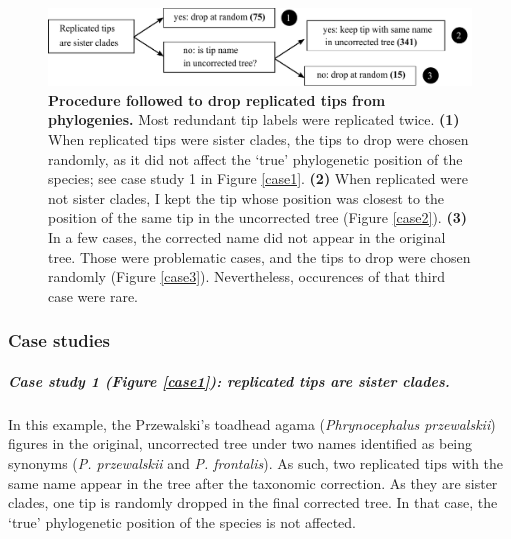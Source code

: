 \documentclass[11pt]{article}
\begin{document}
\begin{figure}[h!]
\centering
\includegraphics[scale=0.7]{figures/chart_phylorep}
\caption[Procedure followed to drop replicated tips from phylogenies]{\textbf{Procedure followed to drop replicated tips from phylogenies.} Most redundant tip labels were replicated twice. \textbf{(1)} When replicated tips were sister clades, the tips to drop were chosen randomly, as it did not affect the `true' phylogenetic position of the species; see case study 1 in Figure \ref{case1}. \textbf{(2)} When replicated were not sister clades, I kept the tip whose position was closest to the position of the same tip in the uncorrected tree (Figure \ref{case2}). \textbf{(3)} In a few cases, the corrected name did not appear in the original tree. Those were problematic cases, and the tips to drop were chosen randomly (Figure \ref{case3}). Nevertheless, occurences of that third case were rare.}
\label{chart_phylorep}
\end{figure}


\newpage
\subsubsection{Case studies}

\subparagraph{Case study 1 (Figure \ref{case1}): replicated tips are sister clades.} In this example, the Przewalski's toadhead agama (\textit{Phrynocephalus przewalskii}) figures in the original, uncorrected tree under two names identified as being synonyms (\textit{P. przewalskii} and \textit{P. frontalis}). As such, two replicated tips with the same name appear in the tree after the taxonomic correction. As they are sister clades, one tip is randomly dropped in the final corrected tree. In that case, the `true' phylogenetic position of the species is not affected.
\end{document}
